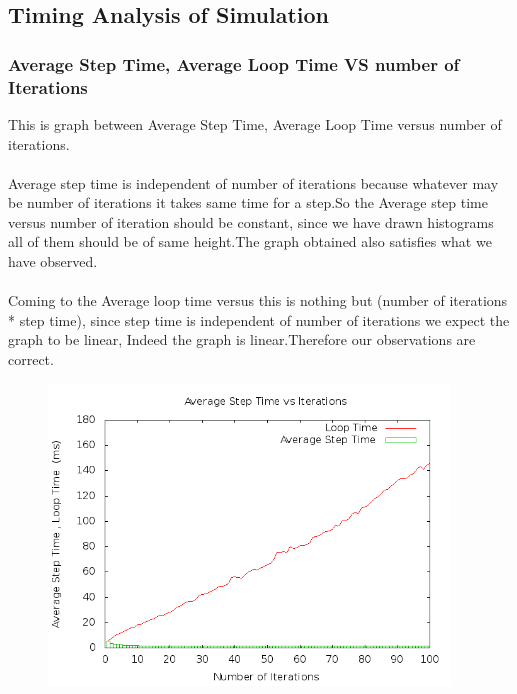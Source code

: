 \documentclass[11pt]{article}
\begin{document}
\subsection{Timing Analysis of Simulation}
\subsubsection{Average Step Time, Average Loop Time VS number of Iterations}
This is graph between Average Step Time, Average Loop Time versus number of iterations.
\\ \\ Average step time is independent of number of iterations because whatever may be number of iterations it takes same time for a step.So the Average step time versus number of iteration should be constant, since we have drawn histograms all of them should be of same height.The graph obtained also satisfies what we have observed.
\\ \\ Coming to the Average loop time versus this is nothing but (number of iterations * step time), since step time is independent of number of iterations we expect the graph to be linear, Indeed the graph is linear.Therefore our observations are correct.
\begin{figure}[ht!]
\centering
\includegraphics[height=8cm]{g23_plot01.png}
\end{figure}
\end{document}

